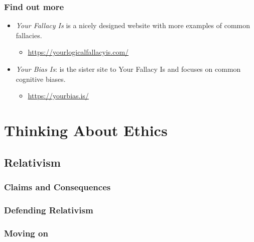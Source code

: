 \documentclass[justified]{tufte-book}
\providecommand{\tightlist}{%
  \setlength{\itemsep}{0pt}\setlength{\parskip}{0pt}}
\begin{document}
\hypertarget{find-out-more}{%
\section*{Find out more}\label{find-out-more}}

\begin{itemize}
\tightlist
\item
  \emph{Your Fallacy Is} is a nicely designed website with more examples of common fallacies.

  \begin{itemize}
  \tightlist
  \item
    \url{https://yourlogicalfallacyis.com/}
  \end{itemize}
\item
  \emph{Your Bias Is}: is the sister site to Your Fallacy Is and focuses on common cognitive biases.

  \begin{itemize}
  \tightlist
  \item
    \url{https://yourbias.is/}
  \end{itemize}
\end{itemize}

\hypertarget{part-thinking-about-ethics}{%
\part{Thinking About Ethics}\label{part-thinking-about-ethics}}

\hypertarget{relativism}{%
\chapter{Relativism}\label{relativism}}

\hypertarget{claims-and-consequences}{%
\section{Claims and Consequences}\label{claims-and-consequences}}

\hypertarget{defending-relativism}{%
\section{Defending Relativism}\label{defending-relativism}}

\hypertarget{moving-on}{%
\section{Moving on}\label{moving-on}}
\end{document}
